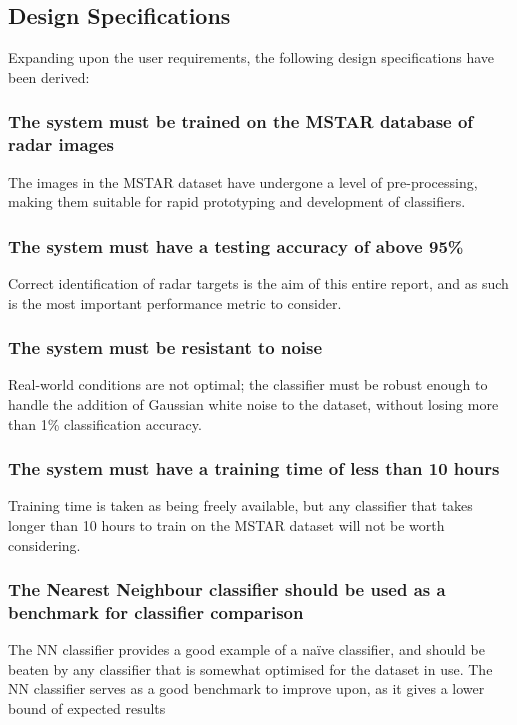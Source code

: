 \subsection{Design Specifications}\label{sec:design_spec}
Expanding upon the user requirements, the following design specifications have been derived:

\subsubsection{The system must be trained on the MSTAR database of radar images}
The images in the MSTAR dataset have undergone a level of pre-processing, making them suitable for rapid prototyping and development of classifiers.

\subsubsection{The system must have a testing accuracy of above 95\%}
Correct identification of radar targets is the aim of this entire report, and as such is the most important performance metric to consider.

\subsubsection{The system must be resistant to noise}
Real-world conditions are not optimal; the classifier must be robust enough to handle the addition of Gaussian white noise to the dataset, without losing more than 1\% classification accuracy.

\subsubsection{The system must have a training time of less than 10 hours}
Training time is taken as being freely available, but any classifier that takes longer than 10 hours to train on the MSTAR dataset will not be worth considering.

\subsubsection{The Nearest Neighbour classifier should be used as a benchmark for classifier comparison}
The NN classifier provides a good example of a na\"ive classifier, and should be beaten by any classifier that is somewhat optimised for the dataset in use. The NN classifier serves as a good benchmark to improve upon, as it gives a lower bound of expected results

